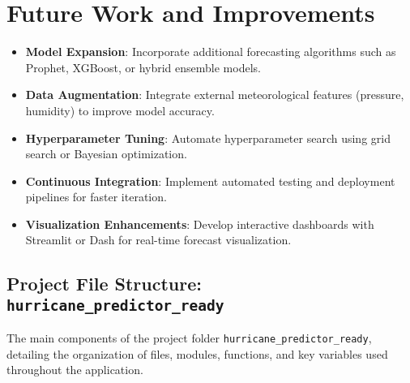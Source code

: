 	



\section{Future Work and Improvements}

\begin{itemize}
	\item \textbf{Model Expansion}: Incorporate additional forecasting algorithms such as Prophet, XGBoost, or hybrid ensemble models.
	\item \textbf{Data Augmentation}: Integrate external meteorological features (pressure, humidity) to improve model accuracy.
	\item \textbf{Hyperparameter Tuning}: Automate hyperparameter search using grid search or Bayesian optimization.
	\item \textbf{Continuous Integration}: Implement automated testing and deployment pipelines for faster iteration.
	\item \textbf{Visualization Enhancements}: Develop interactive dashboards with Streamlit or Dash for real-time forecast visualization.
\end{itemize}

\subsection{Project File Structure: \texttt{hurricane\_predictor\_ready}}

The main components of the project folder \texttt{hurricane\_predictor\_ready}, detailing the organization of files, modules, functions, and key variables used throughout the application.


